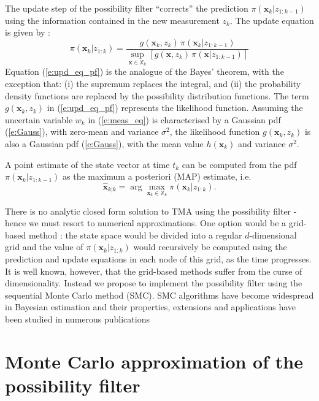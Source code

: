 \documentclass{llncs}
\newcommand{\xb}{\mathbf{x}}
\begin{document}
The update step of the possibility filter ``corrects''  the prediction  $\pi(\xb_k|z_{1:k-1})$ using the information contained in the new measurement $z_k$. The update equation is given by  \cite{houssineau_bishop_17}:
\begin{equation}
\pi(\xb_k|z_{1:k}) = \frac{g(\xb_k,z_k)\,\pi(\xb_k|z_{1:k-1})}{\sup_{\xb\in\mathbb{X}_k} \left[g(\xb,z_k)\,\pi(\xb|z_{1:k-1})\right]}
\label{e:upd_eq_pf}
\end{equation}
Equation (\ref{e:upd_eq_pf}) is the analogue of the Bayes' theorem, with the exception that: (i) the supremum replaces the integral, and (ii) the probability density functions are replaced by the
possibility distribution functions. The term $g(\xb_k,z_k)$ in (\ref{e:upd_eq_pf}) represents the likelihood function. Assuming the uncertain variable  $w_k$ in (\ref{e:meas_eq})  is characterised by a Gaussian pdf  (\ref{e:Gauss}), with zero-mean and variance $\sigma^2$, the likelihood function  $g(\xb_k,z_k)$ is also a Gaussian pdf  (\ref{e:Gauss}), with the mean value  $h(\xb_k)$ and variance $\sigma^2$.

A point estimate of the state vector at time $t_k$ can be computed from the pdf  $\pi(\xb_k|z_{1:k-1})$ as the maximum a posteriori (MAP) estimate, i.e.
\begin{equation}
\widehat{\xb}_{k|k} = \arg\max\limits_{\xb_k\in\mathbb{X}_k}  \pi(\xb_k|z_{1:k}).
\end{equation}

There is no analytic closed form solution to TMA using the possibility filter -  hence we must resort to numerical approximations. One option would be a grid-based method \cite{bishop2017spatial}: the state space would be divided into a regular $d$-dimensional grid and the value of $\pi(\xb_k|z_{1:k})$ would recursively be computed using the prediction and update equations in each node of this grid, as the time progresses.  It is well known, however, that the grid-based methods suffer from the curse of dimensionality. Instead we propose to implement the possibility filter using the sequential Monte Carlo method (SMC).   SMC algorithms have become widespread in Bayesian estimation and their properties, extensions and applications have been studied in numerous publications \cite{smcbook,pf_tute,pfbook,cape_07}


\section{Monte Carlo approximation of the possibility filter}
\label{IV}
\end{document}

